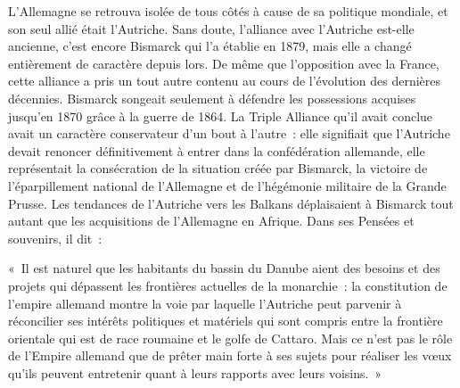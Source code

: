 \documentclass[french,twoside]{book} %
\newenvironment{quoteblock}%
  {\begin{quoting}}
  {\end{quoting}}
\newenvironment{quotebar}{%
    \def\FrameCommand{{\color{rubric!10!}\vrule width 0.5em} \hspace{0.9em}}%
    \def\OuterFrameSep{\itemsep} %
    \MakeFramed {\advance\hsize-\width \FrameRestore}
  }%
  {%
    \endMakeFramed
  }
\renewenvironment{quoteblock}%
  {%
    \savenotes
    \setstretch{0.9}
    \normalfont
    \begin{quotebar}
  }
  {%
    \end{quotebar}
    \spewnotes
  }
\begin{document}
L'Allemagne se retrouva isolée de tous côtés à cause de sa politique mondiale, et son seul allié était l’Autriche. Sans doute, l’alliance avec l’Autriche est-elle ancienne, c’est encore Bismarck qui l’a établie en 1879, mais elle a changé entièrement de caractère depuis lors. De même que l’opposition avec la France, cette alliance a pris un tout autre contenu au cours de l’évolution des dernières décennies. Bismarck songeait seulement à défendre les possessions acquises jusqu’en 1870 grâce à la guerre de 1864. La Triple Alliance qu’il avait conclue avait un caractère conservateur d’un bout à l’autre : elle signifiait que l’Autriche devait renoncer définitivement à entrer dans la confédération allemande, elle représentait la consécration  de la situation créée par Bismarck, la victoire de l’éparpillement national de l’Allemagne et de l’hégémonie militaire de la Grande Prusse. Les tendances de l’Autriche vers les Balkans déplaisaient à Bismarck tout autant que les acquisitions de l’Allemagne en Afrique. Dans ses Pensées et souvenirs, il dit :\par

\begin{quoteblock}
 \noindent « Il est naturel que les habitants du bassin du Danube aient des besoins et des projets qui dépassent les frontières actuelles de la monarchie : la constitution de l’empire allemand montre la voie par laquelle l’Autriche peut parvenir à réconcilier ses intérêts politiques et matériels qui sont compris entre la frontière orientale qui est de race roumaine et le golfe de Cattaro. Mais ce n’est pas le rôle de l’Empire allemand que de prêter main forte à ses sujets pour réaliser les vœux qu’ils peuvent entretenir quant à leurs rapports avec leurs voisins. »
\end{quoteblock}
\end{document}
